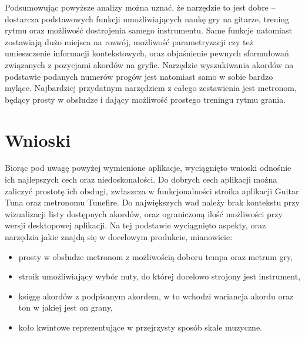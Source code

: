 Podsumowując powyższe analizy można uznać, że narzędzie to jest dobre -- dostarcza podstawowych funkcji umożliwiających naukę gry na gitarze, trening rytmu oraz możliwość dostrojenia samego instrumentu. Same funkcje natomiast zostawiają dużo miejsca na rozwój, możliwość parametryzacji czy też umieszczenie informacji kontekstowych, oraz objaśnienie pewnych sformułowań związanych z pozycjami akordów na gryfie. Narzędzie wyszukiwania akordów na podstawie podanych numerów progów jest natomiast samo w sobie bardzo mylące. Najbardziej przydatnym narzędziem z całego zestawienia jest metronom, będący prosty w obsłudze i dający możliwość prostego treningu rytmu grania. 

\section{Wnioski}
Biorąc pod uwagę powyżej wymienione aplikacje, wyciągnięto wnioski odnośnie ich najlepszych cech oraz niedoskonałości. Do dobrych cech aplikacji można zaliczyć prostotę ich obsługi, zwłaszcza w funkcjonalności stroika aplikacji Guitar Tuna oraz metronomu Tunefire. Do największych wad należy brak kontekstu przy wizualizacji listy dostępnych akordów, oraz ograniczoną ilość możliwości przy wersji desktopowej aplikacji. Na tej podstawie wyciągnięto aspekty, oraz narzędzia jakie znajdą się w docelowym produkcie, mianowicie:

\begin{itemize}
	\item prosty w obsłudze metronom z możliwością doboru tempa oraz metrum gry,
	\item stroik umożliwiający wybór nuty, do której docelowo strojony jest instrument,
	\item księgę akordów z podpisanym akordem, w to wchodzi wariancja akordu oraz ton w jakiej jest on grany,
	\item koło kwintowe reprezentujące w przejrzysty sposób skale muzyczne.
\end{itemize}

